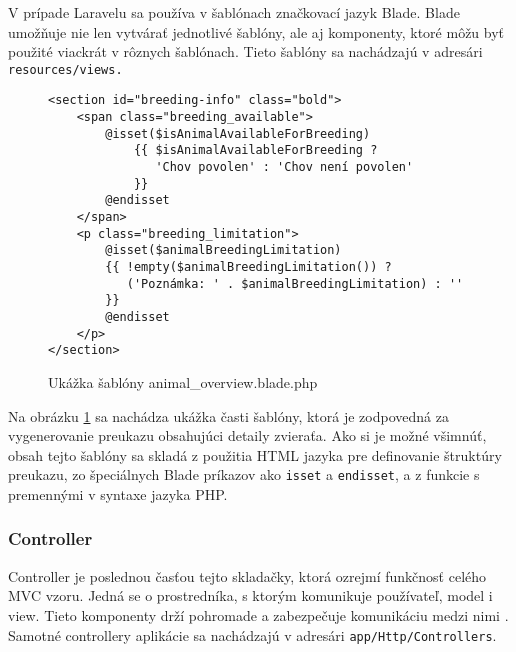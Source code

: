 V prípade Laravelu sa používa v šablónach značkovací jazyk Blade. Blade umožňuje nie len vytvárať jednotlivé šablóny, ale aj komponenty, ktoré môžu byť použité viackrát v rôznych šablónach. Tieto šablóny sa nachádzajú v adresári \texttt{resources/views.}

\begin{figure}[H]
\begin{minipage}[]{\linewidth}
\begin{verbatim}
<section id="breeding-info" class="bold">
    <span class="breeding_available">
        @isset($isAnimalAvailableForBreeding)
            {{ $isAnimalAvailableForBreeding ?
               'Chov povolen' : 'Chov není povolen' 
            }}
        @endisset
    </span>
    <p class="breeding_limitation">
        @isset($animalBreedingLimitation)
        {{ !empty($animalBreedingLimitation()) ?
           ('Poznámka: ' . $animalBreedingLimitation) : '' 
        }}
        @endisset
    </p>
</section>
\end{verbatim}
\end{minipage}
\caption[Ukážka šablóny animal\_overview.blade.php]
{Ukážka šablóny animal\_overview.blade.php}
\label{animal-overview-view-code}
\end{figure}

Na obrázku \ref{animal-overview-view-code} sa nachádza ukážka časti šablóny, ktorá je zodpovedná za vygenerovanie preukazu obsahujúci detaily zvieraťa. Ako si je možné všimnúť, obsah tejto šablóny sa skladá z použitia HTML jazyka pre definovanie štruktúry preukazu, zo špeciálnych Blade príkazov ako \texttt{isset} a \texttt{endisset}, a z funkcie s premennými v syntaxe jazyka PHP.\pagebreak

\subsubsection*{Controller}
Controller je poslednou časťou tejto skladačky, ktorá ozrejmí funkčnosť celého MVC vzoru. Jedná se o prostredníka, s ktorým komunikuje používateľ, model i view. Tieto komponenty drží pohromade a zabezpečuje komunikáciu medzi nimi \cite{mvc-architektura}. Samotné controllery aplikácie sa nachádzajú v adresári \texttt{app/Http/Controllers}.

